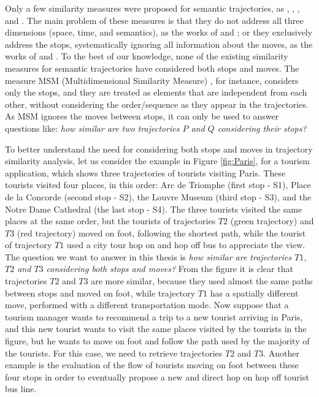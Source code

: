 Only a few  similarity measures were proposed for semantic trajectories, as  \cite{Kang:2009:SMT:1529282.1529580}, \cite{Liu:2012:SMM:2442968.2442971}, \cite{Ying:2010:MUS:1867699.1867703}, and \cite{Furtado:TGIS12156}. The main problem of these measures is that they do not address all three dimensions (space, time, and semantics), as the works of \cite{Kang:2009:SMT:1529282.1529580} and \cite{Liu:2012:SMM:2442968.2442971}; or they exclusively address the stops, systematically ignoring all information about the moves, as the works of \cite{Ying:2010:MUS:1867699.1867703} and \cite{Furtado:TGIS12156}. To the best of our knowledge, none of the existing similarity measures for semantic trajectories have considered both stops and moves. The measure MSM (Multidimensional Similarity Measure) \cite{Furtado:TGIS12156}, for instance, considers only the stops, and they are treated as elements that are independent from each other, without considering the order/sequence as they appear in the trajectories. As MSM ignores the moves between stops, it can only be used to answer questions like: \emph{how similar are two trajectories $P$ and $Q$ considering their stops?}

To better understand the need for considering both stops and moves in trajectory similarity analysis, let us consider the example in Figure \ref{fig:Paris}, for a tourism application, which shows three trajectories of tourists visiting Paris. These tourists visited four places, in this order:  Arc de Triomphe (first stop - S1), Place de la Concorde (second stop - S2), the Louvre Museum (third stop - S3), and the Notre Dame Cathedral (the last stop - S4). The three tourists visited the same places at the same order, but the tourists of trajectories $T2$ (green trajectory) and $T3$ (red trajectory) moved on foot, following the shortest path, while the tourist of trajectory $T1$ used a city tour hop on and hop off bus to appreciate the view. The question we want to answer in this thesis is \emph{how similar are trajectories $T1$, $T2$ and $T3$ considering both stops and moves?} From the figure it is clear that trajectories $T2$ and $T3$ are more similar, because they used almost the same paths between stops and moved on foot, while trajectory $T1$ has a spatially different move, performed with a different transportation mode. Now suppose that a tourism manager wants to recommend a trip to a new tourist arriving in Paris, and this new tourist wants to visit the same places visited by the tourists in the figure, but he wants to move on foot and follow the path used by the majority of the tourists.
For this case, we need to retrieve trajectories $T2$ and $T3$. 
Another example is the evaluation of the flow of tourists moving on foot between these four stops in order to eventually propose a new and direct hop on hop off tourist bus line.

